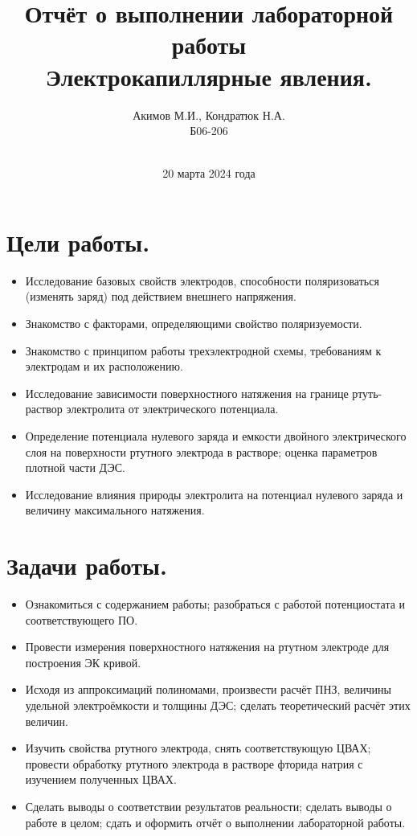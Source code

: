 \documentclass[a4paper, 11pt]{article}%
\author{Акимов М.И., Кондратюк Н.А. \\ Б06-206}
\title{Отчёт о выполнении лабораторной работы  \\ \textbf{Электрокапиллярные явления.}}
\date{\\20 марта 2024 года}
\begin{document}
 \maketitle

       \section{Цели работы.}
        \begin{itemize}
             \item Исследование базовых свойств электродов, способности поляризоваться (изменять заряд) под действием внешнего напряжения. 
             \item Знакомство с факторами, определяющими свойство поляризуемости.
             \item Знакомство с принципом работы трехэлектродной схемы, требованиям к электродам и их расположению.
             \item Исследование зависимости поверхностного натяжения на границе ртуть-раствор
             электролита от электрического потенциала.
             \item Определение потенциала нулевого заряда и емкости двойного электрического
             слоя на поверхности ртутного электрода в растворе; оценка параметров плотной
             части ДЭС.
             \item Исследование влияния природы электролита на потенциал нулевого заряда и
             величину максимального натяжения.
        \end{itemize}

        \section{Задачи работы.}
        \begin{itemize}
             \item Ознакомиться с содержанием работы; разобраться с работой потенциостата и соответствующего ПО.
             \item Провести измерения поверхностного натяжения на ртутном электроде для построения ЭК кривой. 
             \item Исходя из аппроксимаций полиномами, произвести расчёт ПНЗ, величины удельной электроёмкости и толщины ДЭС; сделать теоретический расчёт этих величин.
             \item Изучить свойства ртутного электрода, снять соответствующую ЦВАХ; провести обработку ртутного электрода в растворе фторида натрия с изучением полученных ЦВАХ.
             \item Сделать выводы о соответствии результатов реальности; сделать выводы о работе в целом; сдать и оформить отчёт о выполнении лабораторной работы.
        \end{itemize}
        \newpage
\end{document}
